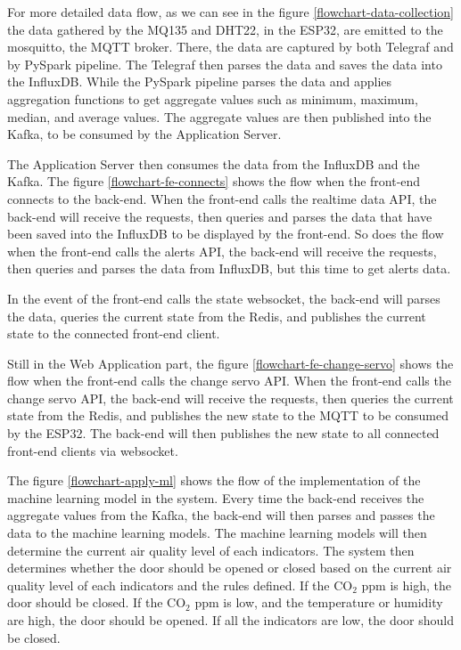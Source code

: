 For more detailed data flow, as we can see in the figure
\ref{flowchart-data-collection} the data gathered
by the MQ135 and DHT22, in the ESP32, are emitted
to the mosquitto, the MQTT broker. There, the data
are captured by both Telegraf and by PySpark
pipeline. The Telegraf then parses the data and
saves the data into the InfluxDB. While the PySpark
pipeline parses the data and applies aggregation
functions to get aggregate values such as minimum,
maximum, median, and average values. The aggregate
values are then published into the Kafka, to be
consumed by the Application Server.

The Application Server then consumes the data from
the InfluxDB and the Kafka. The figure
\ref{flowchart-fe-connects} shows the flow when the
front-end connects to the back-end. When the
front-end calls the realtime data API, the back-end
will receive the requests, then queries and parses
the data that have been saved into the InfluxDB to
be displayed by the front-end.
So does the flow when the front-end calls the
alerts API, the back-end will receive the requests,
then queries and parses the data from InfluxDB, but this time to get alerts data.

In the event of the front-end calls the state
websocket, the back-end will parses the data,
queries the current state from the Redis, and
publishes the current state to the connected
front-end client.

Still in the Web Application part, the figure
\ref{flowchart-fe-change-servo} shows the flow when
the front-end calls the change servo API. When the
front-end calls the change servo API, the back-end
will receive the requests, then queries the current
state from the Redis, and publishes the new state
to the MQTT to be consumed by the ESP32. The back-end will then publishes the new state to all connected front-end clients via websocket.

The figure \ref{flowchart-apply-ml} shows the flow
of the implementation of the machine learning
model in the system. Every time the back-end receives
the aggregate values from the Kafka, the back-end
will then parses and passes the data to the machine
learning models. The machine learning models will
then determine the current air quality level of
each indicators. The system then determines whether
the door should be opened or closed based on the
current air quality level of each indicators and
the rules defined. If the CO$_2$ ppm is high, the
door should be closed. If the CO$_2$ ppm is low,
and the temperature or humidity are high, the door
should be opened. If all the indicators are low,
the door should be closed.


